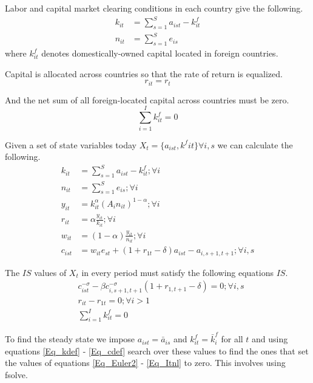 \documentclass[letterpaper,12pt]{article}
\theoremstyle{definition}
\numberwithin{equation}{section}
\begin{document}
\begin{spacing}{1.5}
	Labor and capital market clearing conditions in each country give the following.
	\begin{align}
		k_{it} & = \sum_{s=1}^S a_{ist} - k_{it}^f\\
		n_{it} & = \sum_{s=1}^S e_{is}
	\end{align}
	where $k_{it}^f$ denotes domestically-owned capital located in foreign countries.

	Capital is allocated across countries so that the rate of return is equalized.
	\begin{equation} \label{Eq_requal}
		r_{it} = r_t
	\end{equation}

	And the net sum of all foreign-located capital across countries must be zero.
	\begin{equation}
		\sum_{i=1}^I k^f_{it} = 0
	\end{equation}

	Given a set of state variables today $X_t = \{a_{ist},k^f{it}\} \forall i,s$ we can calculate the following.
	\begin{align}
		k_{it} & = \sum_{s=1}^S a_{ist} - k_{it}^f; \forall i \label{Eq_kdef}\\
		n_{it} & = \sum_{s=1}^S e_{is}; \forall i \\
		y_{it} & = k_{it}^\alpha \left( A_{i} n_{it} \right)^{1-\alpha} ; \forall i \\
		r_{it} & = \alpha \frac{y_{it}}{k_{it}}; \forall i \label{Eq_rdef}\\
		w_{it} & = (1-\alpha) \frac{y_{it}}{n_{it}}; \forall i \label{Eq_wdef}\\		
    	c_{ist} & = w_{it} e_{st} + (1+r_{1t}-\delta)a_{ist} - a_{i,s+1,t+1} ; \forall i,s \label{Eq_cdef}
	\end{align}

	The $IS$ values of $X_t$ in every period must satisfy the following equations $IS$.
	\begin{align}
		& c_{ist}^{-\sigma} - \beta c_{i,s+1,t+1}^{-\sigma}(1+r_{1,t+1}-\delta) = 0; \forall i,s \label{Eq_Euler2}\\ 
		& r_{it} - r_{1t} = 0; \forall i>1 \\
		& \sum_{i=1}^I k^f_{it} = 0 \label{Eq_Itnl}
	\end{align}

	To find the steady state we impose $a_{ist} = \bar a_{is}$ and $k^f_{it}=\bar k^f_i$ for all $t$ and using equations \eqref{Eq_kdef} - \eqref{Eq_cdef} search over these values to find the ones that set the values of equations \eqref{Eq_Euler2} - \eqref{Eq_Itnl} to zero.  This involves using fsolve.


\end{spacing}
\end{document}
